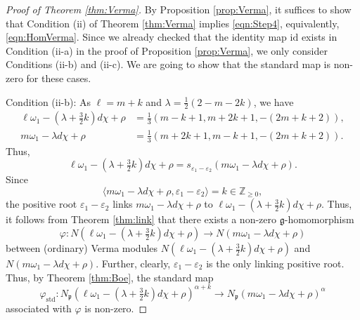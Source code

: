 \documentclass[reqno,11pt]{amsart}
\theoremstyle{remark}
\numberwithin{equation}{section}
\newcommand{\ga}{\alpha}
\newcommand{\eps}{\varepsilon}
\newcommand{\fg}{{\mathfrak g}}
\newcommand{\fp}{{\mathfrak p}}
\newcommand{\Z}{\mathbb{Z}}
\newcommand{\IP}[2]{\langle#1 , #2\rangle}     %
\newcommand{\To}{\longrightarrow}
\newcommand{\id}{\mathrm{id}}
\newcommand{\std}{\mathrm{std}}
\begin{document}
\begin{proof}[Proof of Theorem \ref{thm:Verma}]
By Proposition \ref{prop:Verma}, it suffices to show that 
Condition (ii) of Theorem \ref{thm:Verma} implies \eqref{eqn:Step4},
equivalently, \eqref{eqn:HomVerma}.
Since we already checked that the identity map $\id$ exists in Condition (ii-a) in the proof of Proposition \ref{prop:Verma}, we only consider Conditions (ii-b) and (ii-c). 
We are going to show that the standard map is non-zero for these cases.
 
 \vskip 0.1in
 
\noindent
Condition (ii-b): 
As $\ell = m+k$ and $\lambda = \tfrac{1}{2}(2-m-2k)$, we have
\begin{align*}
\ell\omega_1 -(\lambda +\tfrac{3}{2}k)d\chi+\rho 
&=\tfrac{1}{3}(m-k+1, m+2k+1, -(2m+k+2)),\\
m\omega_1 -\lambda d\chi+\rho
&=\tfrac{1}{3}(m+2k+1, m-k+1, -(2m+k+2)).
\end{align*}
Thus,
\begin{equation*}
\ell\omega_1 -(\lambda +\tfrac{3}{2}k)d\chi+\rho 
=s_{\eps_1-\eps_2}(m\omega_1 -\lambda d\chi+\rho).
\end{equation*}
Since
\begin{equation*}
\IP{m\omega_1 -\lambda d\chi+\rho}{\eps_1-\eps_2}
=k \in \Z_{\geq 0},
\end{equation*}
the positive root $\eps_1-\eps_2$ links 
$m\omega_1 -\lambda d\chi+\rho$ to 
$\ell\omega_1 -(\lambda +\tfrac{3}{2}k)d\chi+\rho$.
Thus, it follows from Theorem \ref{thm:link} that 
there exists a non-zero $\fg$-homomorphism 
\begin{equation*}
\varphi \colon
N(\ell\omega_1 -(\lambda +\tfrac{3}{2}k)d\chi+\rho)
\To
N(m\omega_1 -\lambda d\chi+\rho)
\end{equation*}
between (ordinary) Verma modules
$N(\ell\omega_1 -(\lambda +\tfrac{3}{2}k)d\chi+\rho)$
and
$N(m\omega_1 -\lambda d\chi+\rho)$.
Further, clearly, $\eps_1-\eps_2$ is the only linking positive root.
Thus, by Theorem \ref{thm:Boe}, 
the standard map
\begin{equation*}
\varphi_{\std}\colon
N_\fp(\ell\omega_1 -(\lambda +\tfrac{3}{2}k)d\chi+\rho)^{\ga+k}
\to
N_\fp(m\omega_1 -\lambda d\chi+\rho)^\ga
\end{equation*}
associated with $\varphi$ is non-zero. 
 
 \vskip 0.1in


\end{proof}
\end{document}
